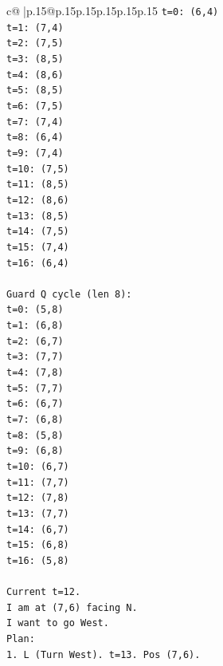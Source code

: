 \documentclass{article}
\begin{document}
{\begin{supertabular}{c@{$\;$}|p{.15\linewidth}@{}p{.15\linewidth}p{.15\linewidth}p{.15\linewidth}p{.15\linewidth}p{.15\linewidth}}
{{{\texttt{t=0: (6,4)} \\
\texttt{t=1: (7,4)} \\
\texttt{t=2: (7,5)} \\
\texttt{t=3: (8,5)} \\
\texttt{t=4: (8,6)} \\
\texttt{t=5: (8,5)} \\
\texttt{t=6: (7,5)} \\
\texttt{t=7: (7,4)} \\
\texttt{t=8: (6,4)} \\
\texttt{t=9: (7,4)} \\
\texttt{t=10: (7,5)} \\
\texttt{t=11: (8,5)} \\
\texttt{t=12: (8,6)} \\
\texttt{t=13: (8,5)} \\
\texttt{t=14: (7,5)} \\
\texttt{t=15: (7,4)} \\
\texttt{t=16: (6,4)} \\
\\ 
\texttt{Guard Q cycle (len 8):} \\
\texttt{t=0: (5,8)} \\
\texttt{t=1: (6,8)} \\
\texttt{t=2: (6,7)} \\
\texttt{t=3: (7,7)} \\
\texttt{t=4: (7,8)} \\
\texttt{t=5: (7,7)} \\
\texttt{t=6: (6,7)} \\
\texttt{t=7: (6,8)} \\
\texttt{t=8: (5,8)} \\
\texttt{t=9: (6,8)} \\
\texttt{t=10: (6,7)} \\
\texttt{t=11: (7,7)} \\
\texttt{t=12: (7,8)} \\
\texttt{t=13: (7,7)} \\
\texttt{t=14: (6,7)} \\
\texttt{t=15: (6,8)} \\
\texttt{t=16: (5,8)} \\
\\ 
\texttt{Current t=12.} \\
\texttt{I am at (7,6) facing N.} \\
\texttt{I want to go West.} \\
\texttt{Plan:} \\
\texttt{1. L (Turn West). t=13. Pos (7,6).} \\
}}}
\end{supertabular}}
\end{document}

